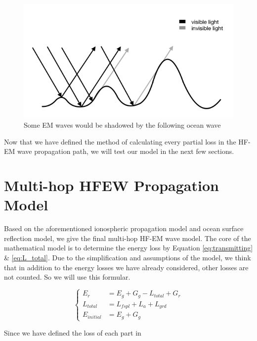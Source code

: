 \documentclass{mcmthesis}
\begin{document}
    \begin{figure}[h]
      \centering
      \includegraphics[scale=0.5]{Visible}
      \caption{Some EM waves would be shadowed by the following ocean wave}
      \label{fig:visible}
    \end{figure}

    Now that we have defined the method of calculating every partial loss in the HF-EM wave propagation path, we will test our model in the next few sections.

\section{Multi-hop HFEW Propagation Model}

    Based on the aforementioned ionospheric propagation model and ocean surface reflection model, we give the final multi-hop HF-EM wave model. The core of the mathematical model is to determine the energy loss by Equation \ref{eq:transmitting} \& \ref{eq:L_total}. Due to the simplification and assumptions of the model, we think that in addition to the energy losses we have already considered, other losses are not counted. So we will use this formular.

    \begin{equation}\label{eq:L_finaluse}
    \left\{
    \begin{aligned}
        E_{r} &= E_{g} + G_{g} - L_{total} + G_{r} \\
        L_{total} &= L_{fspl} + L_{a} + L_{grd} \\
        E_{initial} &= E_{g} + G_{g}
    \end{aligned}
    \right.
    \end{equation}

    Since we have defined the loss of each part in
\end{document}
